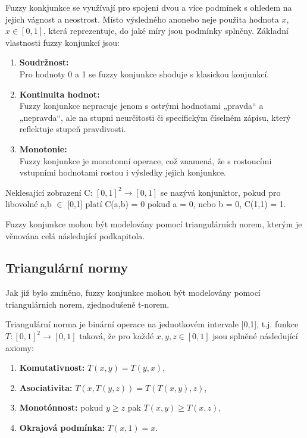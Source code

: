 Fuzzy konkjunkce se využívají pro spojení dvou a více podmínek s ohledem na jejich vágnost a neostrost. Místo výsledného \clqq ano\crqq \space nebo \clqq ne\crqq \space je použita hodnota $x$, $x \in [0,1]$, která reprezentuje, do jaké míry jsou podmínky splněny.  
Základní vlastnosti fuzzy konjunkcí jsou:
\begin{enumerate}
    \item \textbf{Soudržnost:}\\
    Pro hodnoty 0 a 1 se fuzzy konjunkce shoduje s klasickou konjunkcí.
    \item \textbf{Kontinuita hodnot:}\\
    Fuzzy konjunkce nepracuje jenom s  ostrými hodnotami „pravda“ a „nepravda“, ale na stupni neurčitosti či specifickým číselném zápisu, který reflektuje stupeň pravdivosti.
    \item \textbf{Monotonie:}\\
    Fuzzy konjunkce je monotonní operace, což znamená, že s rostoucími vstupními hodnotami rostou i výsledky jejich konjunkce.
\end{enumerate}
\begin{definition}
    \cite{KMP}
    Neklesající zobrazení C: $[0,1]^2 \rightarrow [0,1]$ se nazývá konjunktor, pokud pro libovolné a,b $\in$ [0,1] platí
    C(a,b) = 0 pokud a = 0, nebo b = 0,
    C(1,1) = 1.
    \end{definition}

\begin{remark}
    Fuzzy konjunkce mohou být modelovány pomocí triangulárních norem, kterým je věnována celá následující podkapitola.
\end{remark}

\subsection{Triangul\'arn\'i normy} 

Jak již bylo zmíněno, fuzzy konjunkce mohou být modelov\' any pomocí triangulárních norem, zjednodušeně t-norem. 
\begin{definition}
\cite{KMP}
    Triangulární norma je binární operace na jednotkovém intervale [0,1], t.j. funkce $T: [0,1]^2 \rightarrow [0,1]$ taková, že pro každé $x, y, z \in [0,1]$ jsou splněné následující axiomy:
    \begin{enumerate}
        \item \textbf{Komutativnost:} $T(x,y) = T(y,x)$,
        \item \textbf{Asociativita:} $T(x, T(y, z)) = T(T(x, y), z)$,
        \item \textbf{Monotónnost:} pokud $y \geq z$ pak $T(x, y) \geq T(x, z)$,
        \item \textbf{Okrajová podmínka:} $T(x, 1) = x$.
    \end{enumerate}
\end{definition}

